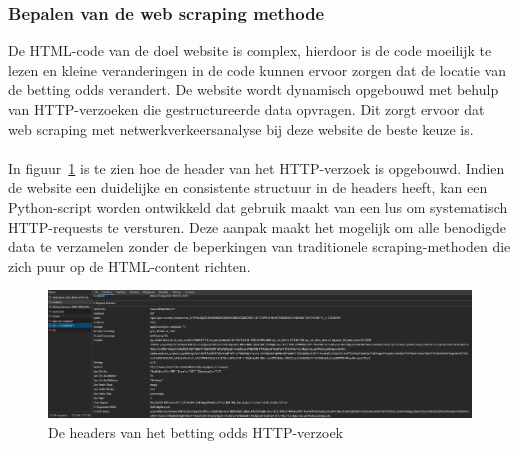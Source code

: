 \subsubsection{Bepalen van de web scraping methode}
De HTML-code van de doel website is complex, hierdoor is de code moeilijk te lezen en kleine veranderingen in de code kunnen ervoor zorgen dat de locatie van de betting odds verandert. De website wordt dynamisch opgebouwd met behulp van HTTP-verzoeken die gestructureerde data opvragen. Dit zorgt ervoor dat web scraping met netwerkverkeersanalyse bij deze website de beste keuze is.
\\
\\
In figuur~\ref{fig:networktab4} is te zien hoe de header van het HTTP-verzoek is opgebouwd. Indien de website een duidelijke en consistente structuur in de headers heeft, kan een Python-script worden ontwikkeld dat gebruik maakt van een lus om systematisch HTTP-requests te versturen. Deze aanpak maakt het mogelijk om alle benodigde data te verzamelen zonder de beperkingen van traditionele scraping-methoden die zich puur op de HTML-content richten.
\begin{figure}[h]
    \centering
    \includegraphics[width=\linewidth]{graphics/headers.png}
    \caption{De headers van het betting odds HTTP-verzoek}
    \label{fig:networktab4}
\end{figure}


